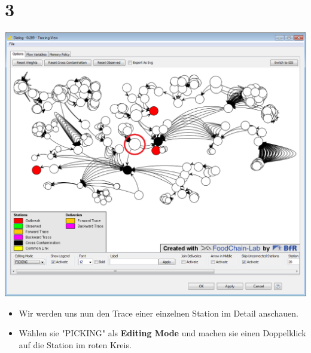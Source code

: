 \documentclass{beamer}
\begin{document}
\section{3}
\begin{frame}
	\begin{center}
  		\includegraphics[height=0.6\textheight]{3.png}
	\end{center}
	\begin{itemize}
		\item Wir werden uns nun den Trace einer einzelnen Station im Detail anschauen.
		\item Wählen sie "PICKING" als \textbf{Editing Mode} und machen sie einen Doppelklick auf die Station im roten Kreis.
	\end{itemize}
\end{frame}
\end{document}
